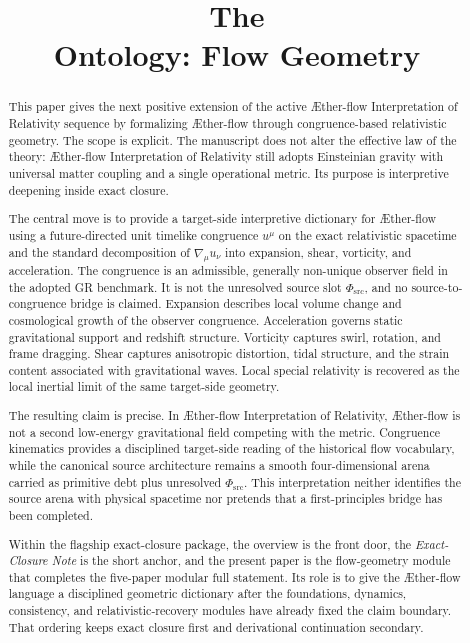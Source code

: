 \documentclass[11pt]{article}
\title{The \TheoryName{}\\[0.4em]
Ontology: Flow Geometry}
\author{}
\date{}
\newcommand{\Aflow}{\AE{}ther-flow}
\newcommand{\TheoryName}{\Aflow{} Interpretation of Relativity}
\newcommand{\PhiSrc}{\Phi_{\mathrm{src}}}
\begin{document}
\AetherFlowAPATitlePage

\begin{abstract}
This paper gives the next positive extension of the active \TheoryName{} sequence by formalizing \Aflow{} through congruence-based relativistic geometry. The scope is explicit. The manuscript does not alter the effective law of the theory: \TheoryName{} still adopts Einsteinian gravity with universal matter coupling and a single operational metric. Its purpose is interpretive deepening inside exact closure.

The central move is to provide a target-side interpretive dictionary for
\Aflow{} using a future-directed unit timelike congruence \(u^\mu\) on the
exact relativistic spacetime and the standard decomposition of
\(\nabla_\mu u_\nu\) into expansion, shear, vorticity, and acceleration. The
congruence is an admissible, generally non-unique observer field in the
adopted GR benchmark. It is not the unresolved source slot \(\PhiSrc\), and no
source-to-congruence bridge is claimed. Expansion describes local volume
change and cosmological growth of the observer congruence. Acceleration
governs static gravitational support and redshift structure. Vorticity
captures swirl, rotation, and frame dragging. Shear captures anisotropic
distortion, tidal structure, and the strain content associated with
gravitational waves. Local special relativity is recovered as the local
inertial limit of the same target-side geometry.

The resulting claim is precise. In \TheoryName{}, \Aflow{} is not a second
low-energy gravitational field competing with the metric. Congruence
kinematics provides a disciplined target-side reading of the historical flow
vocabulary, while the canonical source architecture remains a smooth
four-dimensional arena carried as primitive debt plus unresolved
\(\PhiSrc\). This interpretation neither identifies the source arena with
physical spacetime nor pretends that a first-principles bridge has been
completed.

Within the flagship exact-closure package, the overview is the front door, the \emph{Exact-Closure Note} is the short anchor, and the present paper is the flow-geometry module that completes the five-paper modular full statement. Its role is to give the \Aflow{} language a disciplined geometric dictionary after the foundations, dynamics, consistency, and relativistic-recovery modules have already fixed the claim boundary. That ordering keeps exact closure first and derivational continuation secondary.
\end{abstract}
\end{document}
